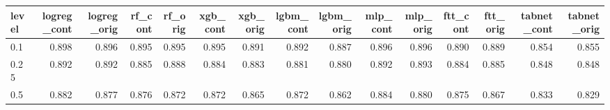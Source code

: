 \begin{tabular}{lrrrrrrrrrrrrrr}
\toprule
level & logreg\_cont & logreg\_orig & rf\_cont & rf\_orig & xgb\_cont & xgb\_orig & lgbm\_cont & lgbm\_orig & mlp\_cont & mlp\_orig & ftt\_cont & ftt\_orig & tabnet\_cont & tabnet\_orig \\
\midrule
0.1 & 0.898 & 0.896 & 0.895 & 0.895 & 0.895 & 0.891 & 0.892 & 0.887 & 0.896 & 0.896 & 0.890 & 0.889 & 0.854 & 0.855 \\
0.25 & 0.892 & 0.892 & 0.885 & 0.888 & 0.884 & 0.883 & 0.881 & 0.880 & 0.892 & 0.893 & 0.884 & 0.885 & 0.848 & 0.848 \\
0.5 & 0.882 & 0.877 & 0.876 & 0.872 & 0.872 & 0.865 & 0.872 & 0.862 & 0.884 & 0.880 & 0.875 & 0.867 & 0.833 & 0.829 \\
\bottomrule
\end{tabular}
